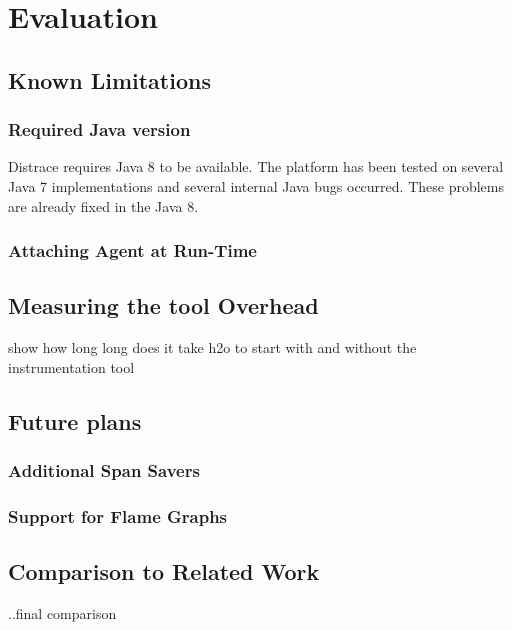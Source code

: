 \chapter{Evaluation}
\label{chap:evaluation}

\section{Known Limitations}
\subsection{Required Java version}
Distrace requires Java 8 to be available. The platform has been tested on several Java 7 implementations and several internal Java bugs occurred. These problems are already fixed in the Java 8.

\subsection{Attaching Agent at Run-Time}

\section{Measuring the tool Overhead}
show how long long does it take h2o to start with and without the instrumentation tool
\section{Future plans}
\subsection{Additional Span Savers}
\subsection{Support for Flame Graphs}

\section{Comparison to Related Work}
..final comparison

